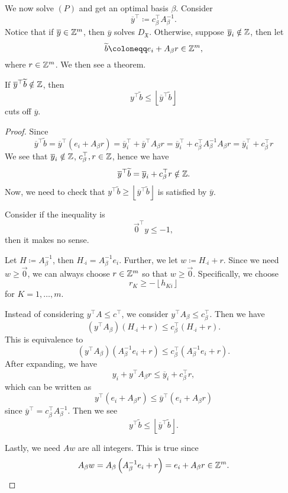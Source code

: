 We now solve \((P)\) and get an optimal basis \(\beta\). Consider
\[
	\overline{y}^{\top}\coloneqq c_{\beta}^{\top}A^{-1}_{\beta}.
\]
Notice that if \(\overline{y}\in\mathbb{\MakeUppercase{Z}}^m\), then \(\overline{y}\) solves \(D_{\mathfrak{X}}\). Otherwise, suppose
\(\overline{y}_{i}\notin \mathbb{\MakeUppercase{Z}}\), then let
\[
	\widetilde{b}\coloneqq e_{i} + A_{\beta}r\in\mathbb{\MakeUppercase{Z}}^m,
\]
where \(r\in\mathbb{\MakeUppercase{Z}}^m\). We then see a theorem.
\begin{theorem}
	If \(\overline{y}^{\top}\widetilde{b}\notin \mathbb{\MakeUppercase{Z}}\), then
	\[
		y^{\top}\widetilde{b}\leq \left\lfloor \overline{y}^{\top}\widetilde{b} \right\rfloor
	\]
	cuts off \(\overline{y}\).
\end{theorem}
\begin{proof}
	Since
	\[
		\overline{y}^{\top}\widetilde{b} = \overline{y}^{\top}(e_{i}+A_{\beta}r) = \overline{y}_{i}^{\top} + \overline{y}^{\top}A_{\beta}r = \overline{y}_{i}^{\top} +c_{\beta}^{\top}A^{-1}_{\beta}A_{\beta}r = \overline{y}_{i}^{\top} +c^{\top}_{\beta}r
	\]
	We see that \(\overline{y}_{i}\notin\mathbb{\MakeUppercase{Z}}\), \(c_{\beta}^{\top}, r\in \mathbb{\MakeUppercase{Z}}\), hence we have
	\[
		\overline{y}^{\top}\widetilde{b} = \overline{y}_{i}+c^{\top}_{\beta}r\notin \mathbb{\MakeUppercase{Z}}.
	\]
	Now, we need to check that \(y^{\top}\widetilde{b}\geq \left\lfloor \overline{y}^{\top}\widetilde{b} \right\rfloor\) is satisfied by \(\overline{y}\).

	\begin{intuition}
		Consider if the inequality is
		\[
			\vec{0}^{\top}y\leq -1,
		\]
		then it makes no sense.
	\end{intuition}

	Let \(H\coloneqq A^{-1}_{\beta}\), then \(H_{\cdot i} = A^{-1}_{\beta}e_{i}\). Further, we let \(w\coloneqq H_{\cdot i}+r\). Since we need
	\(w\geq \vec{0}\), we can always choose \(r\in \mathbb{\MakeUppercase{Z}}^m\) so that \(w\geq \vec{0}\). Specifically, we choose
	\[
		r_K \geq -\left\lfloor h_{Ki} \right\rfloor
	\] for \(K = 1, \ldots , m\).

	Instead of considering \(y^{\top}A\leq c^{\top}\), we consider \(y^{\top}A_{\beta}\leq c_{\beta}^{\top}\). Then we have
	\[
		\left(y^{\top}A_{\beta}\right)\left(H_{\cdot i}+r\right) \leq c_{\beta}^{\top}\left(H_{\cdot i}+r\right).
	\]
	This is equivalence to
	\[
		\left(y^{\top}A_{\beta}\right)\left(A^{-1}_{\beta}e_{i}+r\right) \leq c_{\beta}^{\top}\left(A^{-1}_{\beta}e_{i}+r\right).
	\]
	After expanding, we have
	\[
		y_{i}+y^{\top}A_{\beta}r\leq \overline{y}_{i}+c_{\beta}^{\top}r,
	\]
	which can be written as
	\[
		y^{\top}\left(e_{i}+A_{\beta}r\right) \leq \overline{y}^{\top}\left(e_{i}+A_{\beta}r\right)
	\]
	since \(\overline{y}^{\top} = c_{\beta}^{\top}A^{-1}_{\beta}\). Then we see
	\[
		y^{\top}\widetilde{b}\leq \left\lfloor \overline{y}^{\top}\widetilde{b} \right\rfloor.
	\]

	Lastly, we need \(Aw\) are all integers. This is true since
	\[
		A_{\beta}w = A_{\beta}\left(A^{-1}_{\beta}e_{i}+r\right) = e_{i}+A_{\beta}r \in \mathbb{\MakeUppercase{Z}}^m.
	\]
\end{proof}

